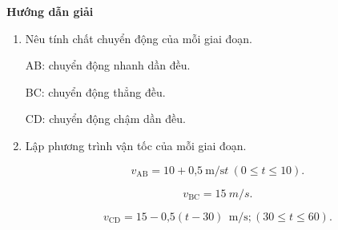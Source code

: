{	\begin{center}
		\textbf{Hướng dẫn giải}
	\end{center}
		\begin{enumerate}
		\item Nêu tính chất chuyển động của mỗi giai đoạn.
	
	AB: chuyển động nhanh dần đều.
	
	BC: chuyển động thẳng đều.
	
	CD: chuyển động chậm dần đều.
	
			\item Lập phương trình vận tốc của mỗi giai đoạn.
	
	$$v_\text{AB} = 10 +\text{0,5}\ \text{m/s} t\ (0\leq t \leq 10).$$
	
	$$v_\text{BC} = \SI{15}{m/s}.$$
	
	$$v_\text{CD} = 15 - \text{0,5}(t-30)\ \ \text{m/s} ; (30 \leq t \leq 60).$$
\end{enumerate}
}

